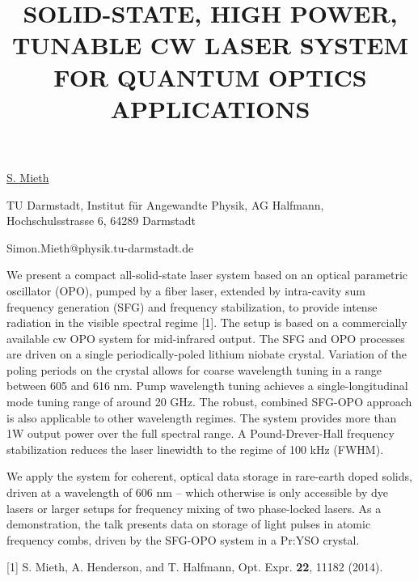 \title{SOLID-STATE, HIGH POWER, TUNABLE CW LASER SYSTEM FOR QUANTUM OPTICS APPLICATIONS}

\underline{S. Mieth} 

{\normalsize{\vspace{-4mm}
TU Darmstadt, Institut f\"{u}r Angewandte Physik, AG Halfmann,
Hochschulsstrasse 6, 64289 Darmstadt

\email Simon.Mieth@physik.tu-darmstadt.de}}

We present a compact all-solid-state laser system based on an optical parametric oscillator (OPO), pumped by a fiber laser, extended by intra-cavity sum frequency generation (SFG) and frequency stabilization, to provide intense radiation in the visible spectral regime [1]. The setup is based on a commercially available cw OPO system for mid-infrared output. The SFG and OPO processes are driven on a single periodically-poled lithium niobate crystal. Variation of the poling periods on the crystal allows for coarse wavelength tuning in a range between 605 and 616 nm. Pump wavelength tuning achieves a single-longitudinal mode tuning range of around 20 GHz. The robust, combined SFG-OPO approach is also applicable to other wavelength regimes. The system provides more than 1W output power over the full spectral range. A Pound-Drever-Hall frequency stabilization reduces the laser linewidth to the regime of 100 kHz (FWHM).

We apply the system for coherent, optical data storage in rare-earth doped solids, driven at a wavelength of 606 nm -- which otherwise is only accessible by dye lasers or larger setups for frequency mixing of two phase-locked lasers. As a demonstration, the talk presents data on storage of light pulses in atomic frequency combs, driven by the SFG-OPO system in a Pr:YSO crystal.

{\normalsize
[1] S. Mieth, A. Henderson, and T. Halfmann, Opt. Expr. \textbf{22}, 11182 (2014).
}

\vspace{\baselineskip}
